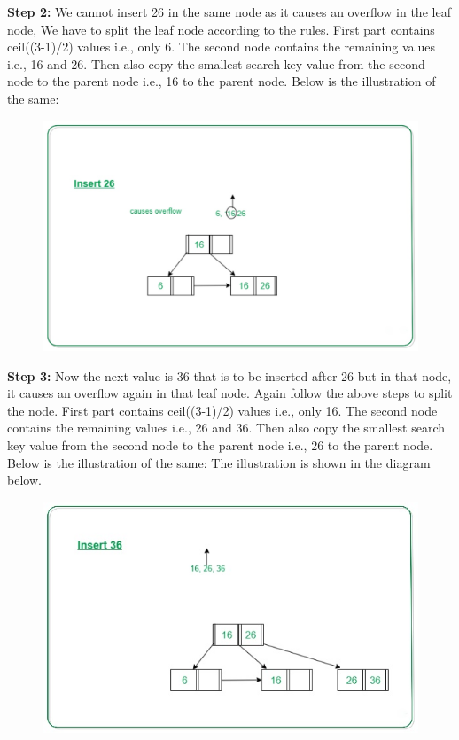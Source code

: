 \documentclass[11pt, a4paper]{article}
\begin{document}
\noindent \textbf{Step 2:} We cannot insert 26 in the same node as it causes an overflow in the leaf node, We have to split the leaf node according to the rules. First part contains ceil((3-1)/2) values i.e., only 6. The second node contains the remaining values i.e., 16 and 26. Then also copy the smallest search key value from the second node to the parent node i.e., 16 to the parent node. Below is the illustration of the same:

\begin{figure}[h]
    \centering
    \includegraphics[scale=0.3]{in4.jpeg}
    \label{in4}
\end{figure}

\noindent \textbf{Step 3:} Now the next value is 36 that is to be inserted after 26 but in that node, it causes an overflow again in that leaf node. Again follow the above steps to split the node. First part contains ceil((3-1)/2) values i.e., only 16. The second node contains the remaining values i.e., 26 and 36. Then also copy the smallest search key value from the second node to the parent node i.e., 26 to the parent node. Below is the illustration of the same:
The illustration is shown in the diagram below. \vspace{4cm}

\begin{figure}[h]
    \centering
    \includegraphics[scale=0.5]{in5.jpeg}
    \label{in5}
\end{figure}
\end{document}
